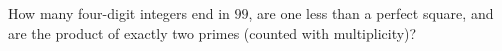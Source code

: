 How many four-digit integers end in $99$, are one less than a perfect square, and are the product of exactly two primes (counted with multiplicity)?
